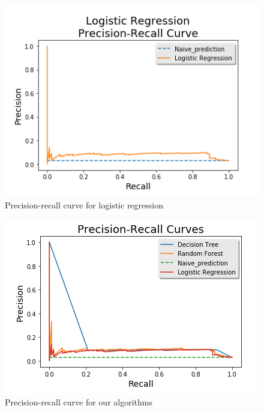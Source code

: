 \documentclass{article}
\begin{document}
\begin{figure}[h]
\centering
\includegraphics[scale=.9]{LR_PR_curve}

\caption{Precision-recall curve for logistic regression}
\label{fig:4}
\end{figure} 


\begin{figure}[h!]
\centering
\includegraphics[scale=.9]{ALL_PR_curves}
\caption{Precision-recall curve for our algorithms}
\label{fig:5}
\end{figure}

\newpage
\
\newpage
\end{document}
